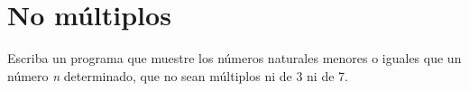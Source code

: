 \section{No múltiplos}

Escriba un programa que muestre los números naturales menores o iguales
que un número \emph{n} determinado, que no sean múltiplos ni de 3 ni de
7.
